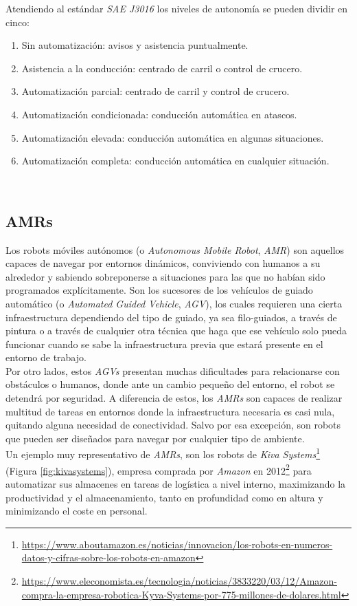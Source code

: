 Atendiendo al estándar \textit{SAE J3016} \cite{saej3016} los niveles de autonomía se pueden dividir en cinco:
\begin{enumerate}
	\item Sin automatización: avisos y asistencia puntualmente.
	\item Asistencia a la conducción: centrado de carril o control de crucero.
	\item Automatización parcial: centrado de carril y control de crucero.
	\item Automatización condicionada: conducción automática en atascos.
	\item Automatización elevada: conducción automática en algunas situaciones.
	\item Automatización completa: conducción automática en cualquier situación.
\end{enumerate}\

\subsection{AMRs}
\label{sec:amr}
Los robots móviles autónomos (o \textit{Autonomous Mobile Robot}, \textit{AMR}) son aquellos capaces de navegar por entornos dinámicos, conviviendo con humanos a su alrededor y sabiendo sobreponerse a situaciones para las que no habían sido programados explícitamente. Son los sucesores de los vehículos de guiado automático (o \textit{Automated Guided Vehicle}, \textit{AGV}), los cuales requieren una cierta infraestructura dependiendo del tipo de guiado, ya sea filo-guiados, a través de pintura o a través de cualquier otra técnica que haga que ese vehículo solo pueda funcionar cuando se sabe la infraestructura previa que estará presente en el entorno de trabajo.\\

Por otro lados, estos \textit{AGVs} presentan muchas dificultades para relacionarse con obstáculos o humanos, donde ante un cambio pequeño del entorno, el robot se detendrá por seguridad. A diferencia de estos, los \textit{AMRs} son capaces de realizar multitud de tareas en entornos donde la infraestructura necesaria es casi nula, quitando alguna necesidad de conectividad. Salvo por esa excepción, son robots que pueden ser diseñados para navegar por cualquier tipo de ambiente.\\

Un ejemplo muy representativo de \textit{AMRs}, son los robots de \textit{Kiva Systems}\footnote{\url{https://www.aboutamazon.es/noticias/innovacion/los-robots-en-numeros-datos-y-cifras-sobre-los-robots-en-amazon}} (Figura \ref{fig:kivasystems}), empresa comprada por \textit{Amazon} en 2012\footnote{\url{https://www.eleconomista.es/tecnologia/noticias/3833220/03/12/Amazon-compra-la-empresa-robotica-Kyva-Systems-por-775-millones-de-dolares.html}} para automatizar sus almacenes en tareas de logística a nivel interno, maximizando la productividad y el almacenamiento, tanto en profundidad como en altura y minimizando el coste en personal.\\

